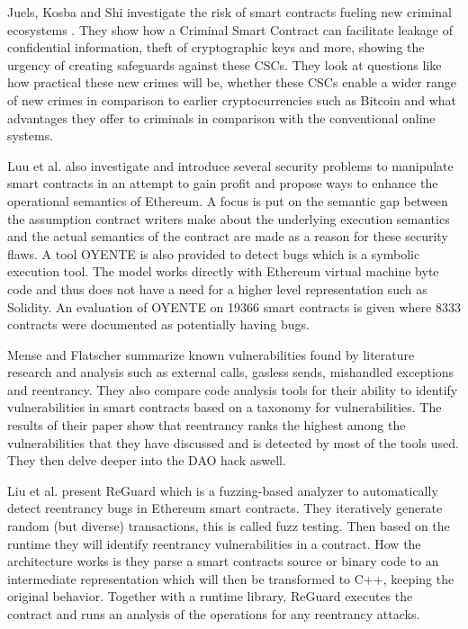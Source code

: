 \documentclass[10pt,conference]{IEEEtran}
\begin{document}
Juels, Kosba and Shi\cite{criminal} investigate the risk of smart contracts fueling new criminal ecosystems . They show how a Criminal Smart Contract can facilitate leakage of confidential information, theft of cryptographic keys and more, showing the urgency of creating safeguards against these CSCs. They look at questions like how practical these new crimes will be, whether these CSCs enable a wider range of new crimes in comparison to earlier cryptocurrencies such as Bitcoin and what advantages they offer to criminals in comparison with the conventional online systems. 


Luu et al.  \cite{smarter} also investigate and introduce several security problems to manipulate smart contracts in an attempt to gain profit and propose ways to enhance the operational semantics of Ethereum. A focus is put on the semantic gap between the assumption contract writers make about the underlying execution semantics and the actual semantics of the contract are made as a reason for these security flaws. A tool OYENTE is also provided to detect bugs which is a symbolic execution tool. The model works directly with Ethereum virtual machine byte code and thus does not have a need for a higher level representation such as Solidity. An evaluation of OYENTE on 19366 smart contracts is given where 8333 contracts were documented as potentially having bugs.

Mense and Flatscher \cite{security} summarize known vulnerabilities found by literature research and analysis such as external calls, gasless sends, mishandled exceptions and reentrancy. They also compare code analysis tools for their ability to identify vulnerabilities in smart contracts based on a taxonomy for vulnerabilities. The results of their paper show that reentrancy ranks the highest among the vulnerabilities that they have discussed and is detected by most of the tools used. They then delve deeper into the DAO hack aswell. 


Liu et al. \cite{reguard} present ReGuard which is a fuzzing-based analyzer to automatically detect reentrancy bugs in Ethereum smart contracts. They iteratively generate random (but diverse) transactions, this is called fuzz testing. Then based on the runtime they will identify reentrancy vulnerabilities in a contract. How the architecture works is they parse a smart contracts source or binary code to an intermediate representation which will then be transformed to C++, keeping the original behavior. Together with a runtime library, ReGuard executes the contract and runs an analysis of the operations for any reentrancy attacks.
\end{document}
